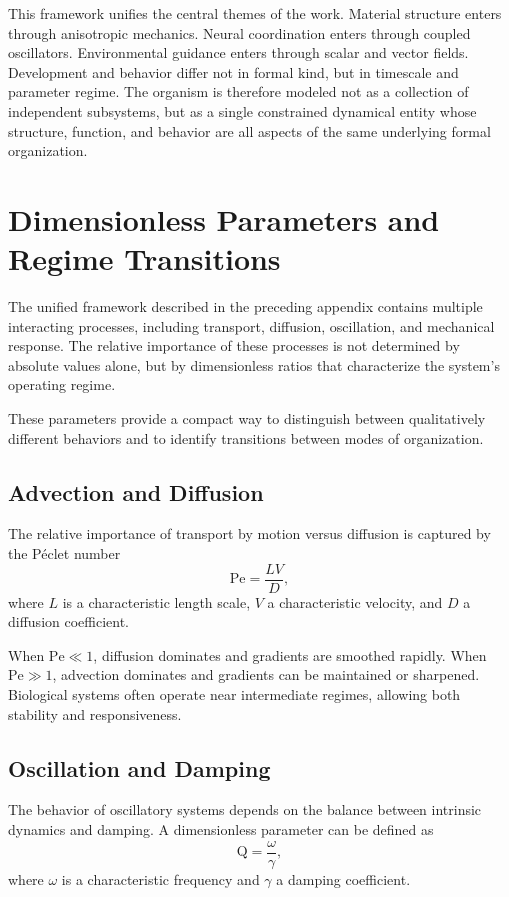 \documentclass[11pt,oneside]{book}
\begin{document}
This framework unifies the central themes of the work. Material structure enters through anisotropic mechanics. Neural coordination enters through coupled oscillators. Environmental guidance enters through scalar and vector fields. Development and behavior differ not in formal kind, but in timescale and parameter regime. The organism is therefore modeled not as a collection of independent subsystems, but as a single constrained dynamical entity whose structure, function, and behavior are all aspects of the same underlying formal organization.

\section{Dimensionless Parameters and Regime Transitions}

The unified framework described in the preceding appendix contains multiple interacting processes, including transport, diffusion, oscillation, and mechanical response. The relative importance of these processes is not determined by absolute values alone, but by dimensionless ratios that characterize the system’s operating regime.

These parameters provide a compact way to distinguish between qualitatively different behaviors and to identify transitions between modes of organization.

\subsection{Advection and Diffusion}

The relative importance of transport by motion versus diffusion is captured by the Péclet number
\[
\mathrm{Pe} = \frac{L V}{D},
\]
where $L$ is a characteristic length scale, $V$ a characteristic velocity, and $D$ a diffusion coefficient.

When $\mathrm{Pe} \ll 1$, diffusion dominates and gradients are smoothed rapidly. When $\mathrm{Pe} \gg 1$, advection dominates and gradients can be maintained or sharpened. Biological systems often operate near intermediate regimes, allowing both stability and responsiveness.

\subsection{Oscillation and Damping}

The behavior of oscillatory systems depends on the balance between intrinsic dynamics and damping. A dimensionless parameter can be defined as
\[
\mathrm{Q} = \frac{\omega}{\gamma},
\]
where $\omega$ is a characteristic frequency and $\gamma$ a damping coefficient.
\end{document}
